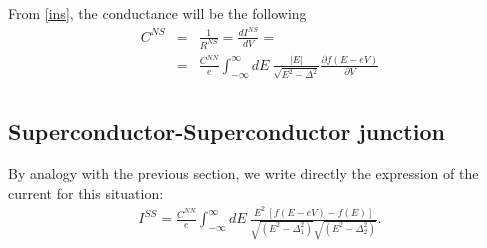 From \eqref{ins}, the conductance will be the following
\begin{eqnarray}\label{cns}
C^{NS} &=& \frac{1}{R^{NS}} = \frac{dI^{NS}}{dV} =
		\nonumber \\
		&=& \frac{C^{NN}}{e} \int_{-\infty}^{\infty} dE\ \frac{|E|}{\sqrt{E^2-\Delta^2}} 
		\frac{\partial f(E-eV)}{\partial V}
		\nonumber \\
\end{eqnarray}

\subsection{Superconductor-Superconductor junction} 
By analogy with the previous section, we write directly the expression of the current for this situation:
\begin{eqnarray}\label{iss}
I^{SS} = \frac{C^{NN}}{e} \int_{-\infty}^{\infty} dE\ 
		\frac{E^2\ [f(E-eV)-f(E)]}{\sqrt{(E^2-\Delta_1 ^2)}\sqrt{(E^2-\Delta_2 ^2)}}.
		\nonumber \\
\end{eqnarray}
